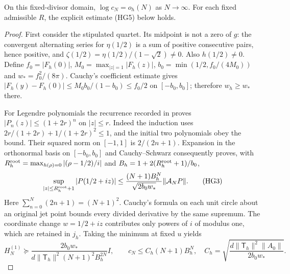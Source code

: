 \begin{hgtheorem}
On this fixed-divisor domain, $\log c_N=o_h(N)$ as $N\to\infty$.
For each fixed admissible $R$, the explicit estimate (HG5) below holds.
\end{hgtheorem}
\begin{proof}
First consider the stipulated quartet. Its midpoint is not a zero of
$g$: the convergent alternating series for $\eta(1/2)$ is a sum of
positive consecutive pairs, hence positive, and
$\zeta(1/2)=\eta(1/2)/(1-\sqrt2)\ne0$. Also $h(1/2)\ne0$.
Define $f_0=|F_h(0)|$, $M_0=\max_{|z|=1}|F_h(z)|$,
$b_0=\min(1/2,f_0/(4M_0))$ and $w_*=f_0^2/(8\pi)$.
Cauchy's coefficient estimate gives
$|F_h(y)-F_h(0)|\le M_0b_0/(1-b_0)\le f_0/2$ on $[-b_0,b_0]$;
therefore $w_h\ge w_*$ there.

For Legendre polynomials the recurrence recorded in
\cite[Table 18.9.1]{hg:DLMF18} proves
$|P_n(z)|\le(1+2r)^n$ on $|z|\le r$. Indeed the induction uses
$2r/(1+2r)+1/(1+2r)^2\le1$, and the initial two polynomials obey
the bound. Their squared norm on $[-1,1]$ is $2/(2n+1)$.
Expansion in the orthonormal basis on $[-b_0,b_0]$ and
Cauchy--Schwarz consequently proves, with
$R_h^{\rm root}=\max_{h(\rho)=0}|(\rho-1/2)/i|$ and
$B_h=1+2(R_h^{\rm root}+1)/b_0$,
\[
 \sup_{|z|\le R_h^{\rm root}+1}|P(1/2+iz)|
 \le\frac{(N+1)B_h^N}{\sqrt{2b_0w_*}}\|\mathcal A_NP\|.
 \tag{HG3}
\]
Here $\sum_{n=0}^N(2n+1)=(N+1)^2$. Cauchy's formula on each
unit circle about an original jet point bounds every divided derivative
by the same supremum. The coordinate change $w=1/2+iz$ contributes
only powers of $i$ of modulus one, which are retained in $j_h$.
Taking the minimum at fixed $u$ yields
\[
 H_N^{(1)}\succeq
 \frac{2b_0w_*}{d\|\mathsf T_h\|^2(N+1)^2B_h^{2N}}I,
 \qquad c_N\le C_h(N+1)B_h^N,
 \quad C_h=\sqrt{\frac{d\|\mathsf T_h\|^2\|A_0\|}{2b_0w_*}}.
 \tag{HG4}
\]


\end{proof}
